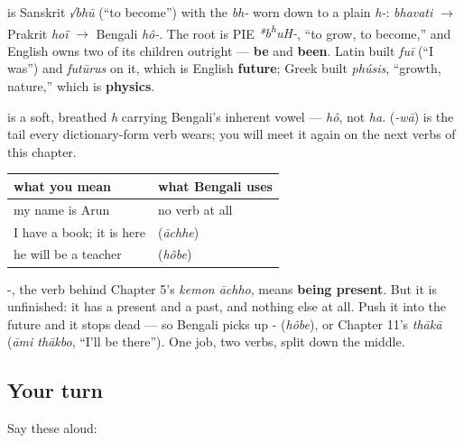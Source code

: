 \begin{cousinweb}
\textbf{} is Sanskrit \emph{√bhū} (\textquotedblleft{}to become\textquotedblright{}) with the \emph{bh-} worn down to a plain \emph{h-}: \emph{bhavati} $\to$ Prakrit \emph{hoï} $\to$ Bengali \emph{hô-}. The root is PIE \emph{*b\textsuperscript{h}uH-}, \textquotedblleft{}to grow, to become,\textquotedblright{} and English owns two of its children outright — \textbf{be} and \textbf{been}. Latin built \emph{fuī} (\textquotedblleft{}I was\textquotedblright{}) and \emph{futūrus} on it, which is English \textbf{future}; Greek built \emph{phúsis}, \textquotedblleft{}growth, nature,\textquotedblright{} which is \textbf{physics}.
\end{cousinweb}

\begin{sounds}
\textbf{} is a soft, breathed \emph{h} carrying Bengali's inherent vowel — \emph{hô}, not \emph{ha}. \textbf{} (\emph{-wā}) is the tail every dictionary-form verb wears; you will meet it again on the next verbs of this chapter.
\end{sounds}

\begin{grammarlens}[title={Grammar Lens: two be-verbs, and one of them is unfinished}]
\noindent
\begin{tabularx}{\linewidth}{@{}>{\raggedright\arraybackslash}X>{\raggedright\arraybackslash}X@{}}
\toprule
\textbf{what you mean} & \textbf{what Bengali uses} \\
\midrule
my name is Arun & no verb at all \\
I have a book; it is here & \textbf{\bn{আছে}} (\emph{āchhe}) \\
he will be a teacher & \textbf{\bn{হবে}} (\emph{hôbe}) \\
\bottomrule
\end{tabularx}

-, the verb behind Chapter 5's \emph{kemon āchho}, means \textbf{being present}. But it is unfinished: it has a present and a past, and nothing else at all. Push it into the future and it stops dead — so Bengali picks up - (\emph{hôbe}), or Chapter 11's \emph{thākā} (\emph{āmi thākbo}, \textquotedblleft{}I'll be there\textquotedblright{}). One job, two verbs, split down the middle.
\end{grammarlens}

\subsection*{Your turn}
Say these aloud:


